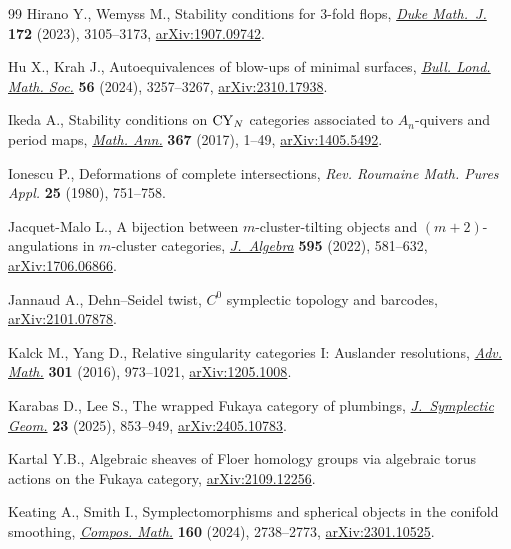 \documentclass[10pt,a4paper]{amsart}
\theoremstyle{definition}
\numberwithin{equation}{section}
\begin{document}
\begin{thebibliography}{99}
Hirano Y., Wemyss M., Stability conditions for 3-fold flops,
 \href{https://doi.org/10.1215/00127094-2022-0097}{\textit{Duke Math.~J.}}
 \textbf{172} (2023), 3105--3173,
 \href{http://arxiv.org/abs/1907.09742}{arXiv:1907.09742}.

Hu X., Krah J., Autoequivalences of blow-ups of minimal surfaces,
 \href{https://doi.org/10.1112/blms.13131}{\textit{Bull. Lond. Math. Soc.}}
 \textbf{56} (2024), 3257--3267,
 \href{http://arxiv.org/abs/2310.17938}{arXiv:2310.17938}.

Ikeda A., Stability conditions on {${\rm CY}_N$} categories associated to
 {$A_n$}-quivers and period maps,
 \href{https://doi.org/10.1007/s00208-016-1375-4}{\textit{Math. Ann.}}
 \textbf{367} (2017), 1--49,
 \href{http://arxiv.org/abs/1405.5492}{arXiv:1405.5492}.

Ionescu P., Deformations of complete intersections, \textit{Rev. Roumaine Math.
 Pures Appl.} \textbf{25} (1980), 751--758.

Jacquet-Malo L., A bijection between {$m$}-cluster-tilting objects and
 {$(m+2)$}-angulations in {$m$}-cluster categories,
 \href{https://doi.org/10.1016/j.jalgebra.2021.11.041}{\textit{J.~Algebra}}
 \textbf{595} (2022), 581--632,
 \href{http://arxiv.org/abs/1706.06866}{arXiv:1706.06866}.

Jannaud A., Dehn--{S}eidel twist, ${C}^0$ symplectic topology and barcodes,
 \href{http://arxiv.org/abs/2101.07878}{arXiv:2101.07878}.

Kalck M., Yang D., Relative singularity categories {I}: {A}uslander
 resolutions, \href{https://doi.org/10.1016/j.aim.2016.06.011}{\textit{Adv.
 Math.}} \textbf{301} (2016), 973--1021,
 \href{http://arxiv.org/abs/1205.1008}{arXiv:1205.1008}.

Karabas D., Lee S., The wrapped {F}ukaya category of plumbings,
 \href{https://doi.org/10.4310/jsg.250820172316}{\textit{J.~Symplectic Geom.}}
 \textbf{23} (2025), 853--949,
 \href{http://arxiv.org/abs/2405.10783}{arXiv:2405.10783}.

Kartal Y.B., Algebraic sheaves of {F}loer homology groups via algebraic torus
 actions on the {F}ukaya category,
 \href{http://arxiv.org/abs/2109.12256}{arXiv:2109.12256}.

Keating A., Smith I., Symplectomorphisms and spherical objects in the conifold
 smoothing, \href{https://doi.org/10.1112/S0010437X24007425}{\textit{Compos.
 Math.}} \textbf{160} (2024), 2738--2773,
 \href{http://arxiv.org/abs/2301.10525}{arXiv:2301.10525}.


\end{thebibliography}
\end{document}
